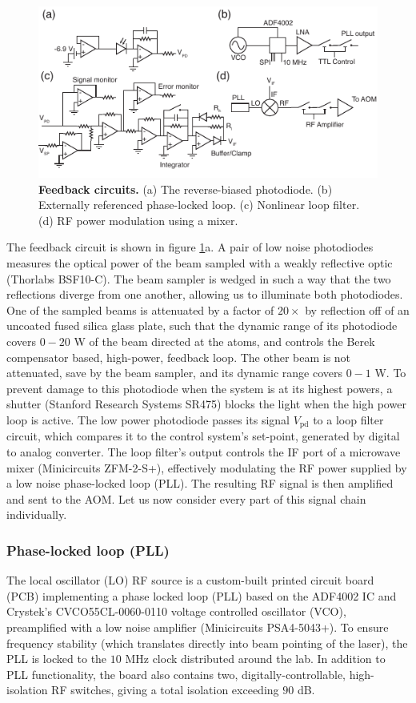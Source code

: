 \documentclass[twocolumn,aps,pra,showpacs,preprintnumbers,bibnotes]{revtex4-1}
\begin{document}
\begin{figure}
  \begin{center}
    \includegraphics{fig/circuits.pdf}
    \caption{\textbf{Feedback circuits.} (a) The reverse-biased photodiode. (b) Externally referenced phase-locked loop. (c) Nonlinear loop filter. (d) RF power modulation using a mixer.}\label{fig:circuits}
  \end{center}
\end{figure}
The feedback circuit is shown in figure \ref{fig:circuits}a. A pair of low noise photodiodes measures the optical power of the beam sampled with a weakly reflective optic (Thorlabs BSF10-C). 
The beam sampler is wedged in such a way that the two reflections diverge from one another, allowing us to illuminate both photodiodes. 
One of the sampled beams is attenuated by a factor of $20\times$ by reflection off of an uncoated fused silica glass plate, such that the dynamic range of its photodiode covers $0-20$ W of the beam directed at the atoms, and controls the Berek compensator based, high-power, feedback loop. 
The other beam is not attenuated, save by the beam sampler, and its dynamic range covers $0-1$ W.
To prevent damage to this photodiode when the system is at its highest powers, a shutter (Stanford Research Systems SR475) blocks the light when the high power loop is active.
The low power photodiode passes its signal $V_{\mathrm{pd}}$ to a loop filter circuit, which compares it to the control system's set-point, generated by digital to analog converter.
The loop filter's output controls the IF port of a microwave mixer (Minicircuits ZFM-2-S+), effectively modulating the RF power supplied by a low noise phase-locked loop (PLL).
The resulting RF signal is then amplified and sent to the AOM.
Let us now consider every part of this signal chain individually.

\subsubsection{Phase-locked loop (PLL)}
The local oscillator (LO) RF source is a custom-built printed circuit board (PCB) implementing a phase locked loop (PLL) based on the ADF4002 IC and Crystek's CVCO55CL-0060-0110 voltage controlled oscillator (VCO), preamplified with a low noise amplifier (Minicircuits PSA4-5043+). 
To ensure frequency stability (which translates directly into beam pointing of the laser), the PLL is locked to the $10$ MHz clock distributed around the lab.
In addition to PLL functionality, the board also contains two, digitally-controllable, high-isolation RF switches, giving a total isolation exceeding $90$ dB.
\end{document}
